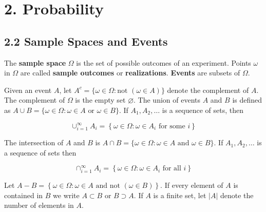 \section{2. Probability}\label{probability}

\subsection{2.2 Sample Spaces and
Events}\label{sample-spaces-and-events}

The \textbf{sample space} \(\Omega\) is the set of possible outcomes of
an experiment. Points \(\omega\) in \(\Omega\) are called \textbf{sample
outcomes} or \textbf{realizations}. \textbf{Events} are subsets of
\(\Omega\).

Given an event \(A\), let
\(A^c = \{ \omega \in \Omega : \text{not } (\omega \in A) \}\) denote
the complement of \(A\). The complement of \(\Omega\) is the empty set
\(\varnothing\). The union of events \(A\) and \(B\) is defined as
\(A \cup B = \{ \omega \in \Omega : \omega \in A \text{ or } \omega \in B \}\).
If \(A_1, A_2, \dots\) is a sequence of sets, then

\[ \cup_{i=1}^\infty A_i = \left\{ \omega \in \Omega : \omega \in A_i \text{ for some } i \right\}\]

The intersection of \(A\) and \(B\) is
\(A \cap B = \{ \omega \in \Omega : \omega \in A \text{ and } \omega \in B \}\).
If \(A_1, A_2, \dots\) is a sequence of sets then

\[ \cap_{i=1}^\infty A_i = \left\{ \omega \in \Omega : \omega \in A_i \text{ for all } i \right\}\]

Let
\(A - B = \left\{ \omega \in \Omega : \omega \in A \text{ and not } (\omega \in B) \right\}\).
If every element of \(A\) is contained in \(B\) we write \(A \subset B\)
or \(B \supset A\). If \(A\) is a finite set, let \(|A|\) denote the
number of elements in \(A\).

